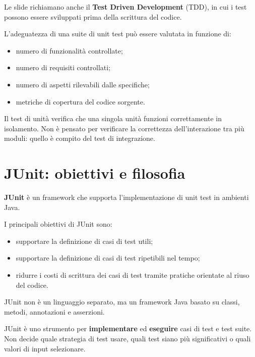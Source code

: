 \begin{notaslide}
Le slide richiamano anche il \textbf{Test Driven Development} (TDD), in cui i test possono essere sviluppati prima della scrittura del codice.
\end{notaslide}

L'adeguatezza di una suite di unit test può essere valutata in funzione di:

\begin{itemize}
    \item numero di funzionalità controllate;
    \item numero di requisiti controllati;
    \item numero di aspetti rilevabili dalle specifiche;
    \item metriche di copertura del codice sorgente.
\end{itemize}

\begin{notaesame}
Il test di unità verifica che una singola unità funzioni correttamente in isolamento. Non è pensato per verificare la correttezza dell'interazione tra più moduli: quello è compito del test di integrazione.
\end{notaesame}

\section{JUnit: obiettivi e filosofia}

\textbf{JUnit} è un framework che supporta l'implementazione di unit test in ambienti Java.

I principali obiettivi di JUnit sono:

\begin{itemize}
    \item supportare la definizione di casi di test utili;
    \item supportare la definizione di casi di test ripetibili nel tempo;
    \item ridurre i costi di scrittura dei casi di test tramite pratiche orientate al riuso del codice.
\end{itemize}

JUnit non è un linguaggio separato, ma un framework Java basato su classi, metodi, annotazioni e asserzioni.

\begin{notaesame}
JUnit è uno strumento per \textbf{implementare} ed \textbf{eseguire} casi di test e test suite. Non decide quale strategia di test usare, quali test siano più significativi o quali valori di input selezionare.
\end{notaesame}

